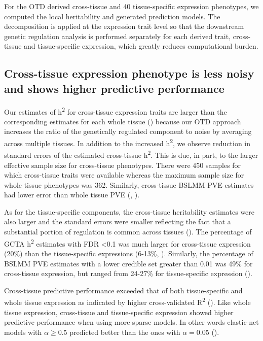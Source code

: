 \documentclass[10pt,letterpaper]{article}
\begin{document}
For the OTD derived cross-tissue and 40 tissue-specific expression phenotypes, we computed the local heritability and generated prediction models.
The decomposition is applied at the expression trait level so that the downstream genetic regulation analysis is performed separately for each derived trait, cross-tissue and tissue-specific expression, which greatly reduces computational burden. 

\subsection*{Cross-tissue expression phenotype is less noisy and shows higher predictive performance}%

Our estimates of h\textsuperscript{2} for cross-tissue expression traits are larger than the corresponding estimates for each whole tissue () because our OTD approach increases the ratio of the genetically regulated component to noise by averaging across multiple tissues. In addition to the increased h\textsuperscript{2}, we observe reduction in standard errors of the estimated cross-tissue h\textsuperscript{2}. This is due, in part, to the larger effective sample size for cross-tissue phenotypes. There were 450 samples for which cross-tissue traits were available whereas the maximum sample size for whole tissue phenotypes was 362. Similarly, cross-tissue BSLMM PVE estimates had lower error than whole tissue PVE (, ). 

As for the tissue-specific components, 
the cross-tissue heritability estimates were also larger and the standard errors were smaller reflecting the fact that a substantial portion of regulation is common across tissues (). The percentage of GCTA h\textsuperscript{2} estimates with FDR \textless{0.1}  was much larger for cross-tissue expression (20\%) than the tissue-specific expressions (6-13\%, ). Similarly, the percentage of BSLMM PVE estimates with a lower credible set greater than 0.01 was 49\% for cross-tissue expression, but ranged from 24-27\% for tissue-specific expression ().

Cross-tissue predictive performance exceeded that of both tissue-specific and whole tissue expression as indicated by higher cross-validated R\textsuperscript{2} (). Like whole tissue expression, cross-tissue and tissue-specific expression showed higher predictive performance when using more sparse models. In other words elastic-net models with \(\alpha \geq 0.5\) predicted better than the ones with \(\alpha=0.05\) (). 
\end{document}
